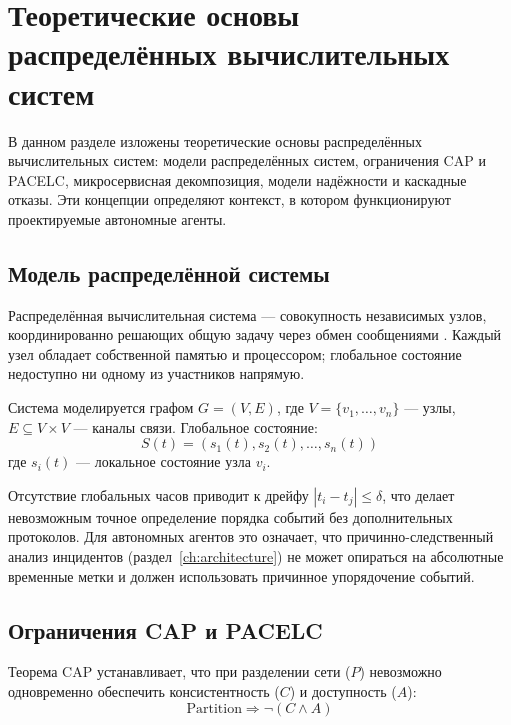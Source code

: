 \chapter{Теоретические основы распределённых вычислительных систем}\label{ch:theory}

В данном разделе изложены теоретические основы распределённых вычислительных систем: модели распределённых систем, ограничения CAP и PACELC, микросервисная декомпозиция, модели надёжности и каскадные отказы. Эти концепции определяют контекст, в котором функционируют проектируемые автономные агенты.

\section{Модель распределённой системы}

Распределённая вычислительная система --- совокупность независимых узлов, координированно решающих общую задачу через обмен сообщениями \cite{tanenbaum_distributed_systems,acm_distributed_systems,russian_distributed_systems}. Каждый узел обладает собственной памятью и процессором; глобальное состояние недоступно ни одному из участников напрямую.

Система моделируется графом $G = (V, E)$, где $V = \{v_1, \ldots, v_n\}$ --- узлы, $E \subseteq V \times V$ --- каналы связи. Глобальное состояние:
\begin{equation}
S(t) = (s_1(t), s_2(t), \ldots, s_n(t))
\label{eq:global_state}
\end{equation}
где $s_i(t)$ --- локальное состояние узла $v_i$.

Отсутствие глобальных часов приводит к дрейфу $|t_i - t_j| \leq \delta$, что делает невозможным точное определение порядка событий без дополнительных протоколов. Для автономных агентов это означает, что причинно-следственный анализ инцидентов (раздел~\ref{ch:architecture}) не может опираться на абсолютные временные метки и должен использовать причинное упорядочение событий.

\section{Ограничения CAP и PACELC}

Теорема CAP \cite{brewer_cap_theorem} устанавливает, что при разделении сети ($P$) невозможно одновременно обеспечить консистентность ($C$) и доступность ($A$):
\begin{equation}
\text{Partition} \Rightarrow \neg(C \land A)
\label{eq:cap_theorem}
\end{equation}

